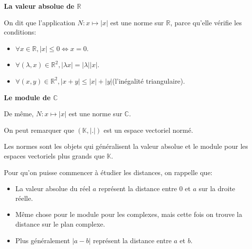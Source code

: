 \documentclass{article}
\begin{document}
\begin{tcolorbox}[colback=cyan!5!white,colframe=cyan!75!black,title=Exemple 1.1]

\textbf{La valeur absolue de $\mathbb{R}$}

On dit que l'application $N: x \mapsto |x|$ est une norme sur $\mathbb{R}$, parce qu'elle vérifie les conditions:

\begin{itemize}
 \item $\forall x \in \mathbb{R}, |x| \leq 0 \Longleftrightarrow x = 0$.
 \item $\forall (\lambda, x) \in {\mathbb{R}}^{2}, |\lambda x| = |\lambda||x|$.
 \item $\forall (x, y) \in {\mathbb{R}}^{2}, |x+y| \leq |x|+|y|$(l'inégalité triangulaire).
\end{itemize}

\textbf{Le module de $\mathbb{C}$}

De même, $N: x \mapsto |x|$ est une norme sur $\mathbb{C}$.

On peut remarquer que $(\mathbb{K}, |.|)$ est un espace vectoriel normé.

\end{tcolorbox}

\begin{tcolorbox}[colback=yellow!5!white,colframe=yellow!75!black,title=Remarque 1.2]

Les normes sont les objets qui généralisent la valeur absolue et le module pour les espaces vectoriels plus grands que $\mathbb{K}$.

\end{tcolorbox}



\begin{tcolorbox}[colback=purple!5!white,colframe=purple!75!black,title=Rappel 1.1]

Pour qu'on puisse commencer à étudier les distances, on rappelle que:

\begin{itemize}
 \item La valeur absolue du réel $a$ représent la distance entre 0 et $a$ sur la droite réelle.
 \item Même chose pour le module pour les complexes, mais cette fois on trouve la distance sur le plan complexe.
 \item Plus généralement $|a-b|$ représent la distance entre $a$ et $b$.
\end{itemize}

\end{tcolorbox}
\end{document}
